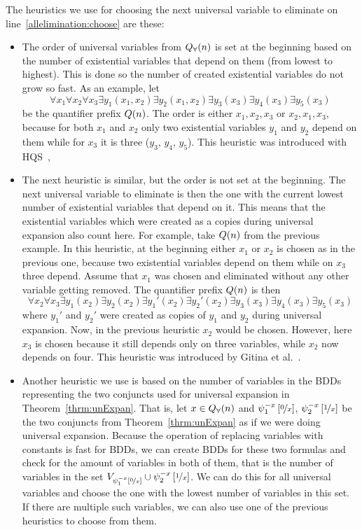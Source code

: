 \documentclass[
  digital, %
  twoside, %
  table,   %
  nolof,     %
  nolot,     %
]{fithesis3}
\theoremstyle{definition}
\theoremstyle{remark}
\newcommand{\substitute}[2]{\left[ \nicefrac{#2}{#1} \right]}
\newcommand{\vars}[1]{V_{#1}}
\begin{document}
The heuristics we use for choosing the next universal variable to eliminate on line~\ref{allelimination:choose} are these:
\begin{itemize}
    \item The order of universal variables from $Q_{\forall}(n)$ is set at the beginning based on the number of existential variables that depend on them (from lowest to highest). This is done so the number of created existential variables do not grow so fast. %
    As an example, let
    \[\forall x_1 \forall x_2 \forall x_3 \exists y_1(x_1, x_2) \exists y_2(x_1,x_2) \exists y_3(x_3) \exists y_4(x_3) \exists y_5 (x_3)\]
    be the quantifier prefix $Q({n})$. The order is either $x_1, x_2, x_3$ or $x_2, x_1, x_3$, because for both $x_1$ and $x_2$ only two existential variables $y_1$ and $y_2$ depend on them while for $x_3$ it is three ($y_3$, $y_4$, $y_5$). This heuristic was introduced with HQS~\cite{HQSquantifierElimination}, 
    \item The next heuristic is similar, but the order is not set at the beginning. The next universal variable to eliminate is then the one with the current lowest number of existential variables that depend on it. This means that the existential variables which were created as a copies during universal expansion also count here. For example, take $Q({n})$ from the previous example. In this heuristic, at the beginning either $x_1$ or $x_2$ is chosen as in the previous one, because two existential variables depend on them while on $x_3$ three depend. Assume that $x_1$ was chosen and eliminated without any other variable getting removed. The quantifier prefix $Q({n})$ is then
    \[\forall x_2 \forall x_3 \exists y_1(x_2) \exists y_2(x_2) \exists y_1'(x_2) \exists y_2'(x_2) \exists y_3(x_3) \exists y_4(x_3) \exists y_5 (x_3)\]
    where $y_1'$ and $y_2'$ were created as copies of $y_1$ and $y_2$ during universal expansion. Now, in the previous heuristic $x_2$ would be chosen. However, here $x_3$ is chosen because it still depends only on three variables, while $x_2$ now depends on four. This heuristic was introduced by Gitina et al.~\cite{HQSsimpleAlg}.
    \item Another heuristic we use is based on the number of variables in the BDDs representing the two conjuncts used for universal expansion in Theorem~\ref{thrm:unExpan}. That is, let $x \in Q_{\forall}(n)$ and $\psi_1^{-x}\substitute{x}{0}$, $\psi_2^{-x}\substitute{x}{1}$
    be the two conjuncts from Theorem~\ref{thrm:unExpan} as if we were doing universal expansion. Because the operation of replacing variables with constants is fast for BDDs, we can create BDDs for these two formulas and check for the amount of variables in both of them, that is the number of variables in the set $\vars{\psi_1^{-x}\substitute{x}{0}} \cup \psi_2^{-x}\substitute{x}{1}$. We can do this for all universal variables and choose the one with the lowest number of variables in this set. If there are multiple such variables, we can also use one of the previous heuristics to choose from them.

\end{itemize}
\end{document}
